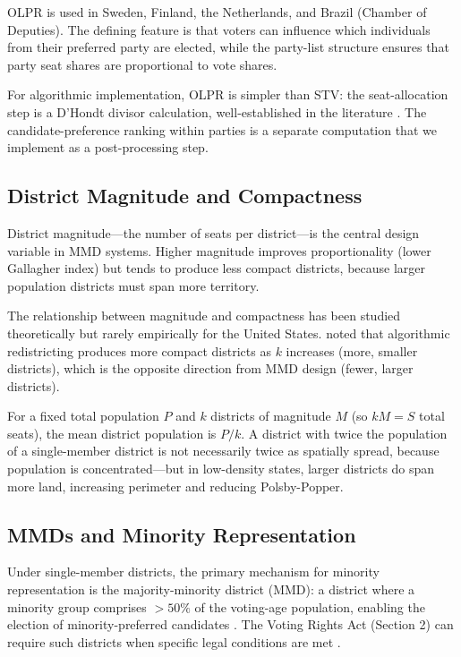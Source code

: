 OLPR is used in Sweden, Finland, the Netherlands, and Brazil (Chamber of
Deputies).  The defining feature is that voters can influence which
individuals from their preferred party are elected, while the party-list
structure ensures that party seat shares are proportional to vote shares.

For algorithmic implementation, OLPR is simpler than STV: the seat-allocation
step is a D'Hondt divisor calculation, well-established in the literature
\citep{balinski1982fair}.  The candidate-preference ranking within parties is
a separate computation that we implement as a post-processing step.

\subsection{District Magnitude and Compactness}

District magnitude---the number of seats per district---is the central design
variable in MMD systems.  Higher magnitude improves proportionality (lower
Gallagher index) but tends to produce less compact districts, because larger
population districts must span more territory.

The relationship between magnitude and compactness has been studied
theoretically \citep{taagepera2007seats} but rarely empirically for the
United States.  \citet{altman2011bqap} noted that algorithmic redistricting
produces more compact districts as $k$ increases (more, smaller districts),
which is the opposite direction from MMD design (fewer, larger districts).

For a fixed total population $P$ and $k$ districts of magnitude $M$ (so
$kM = S$ total seats), the mean district population is $P / k$.  A district
with twice the population of a single-member district is not necessarily twice
as spatially spread, because population is concentrated---but in low-density
states, larger districts do span more land, increasing perimeter and reducing
Polsby-Popper.

\subsection{MMDs and Minority Representation}

Under single-member districts, the primary mechanism for minority
representation is the majority-minority district (MMD): a district where a
minority group comprises $>50\%$ of the voting-age population, enabling
the election of minority-preferred candidates \citep{thernstrom1987whose}.
The Voting Rights Act (Section 2) can require such districts when specific
legal conditions are met \citep{thornburg1986}.

